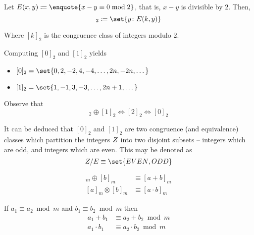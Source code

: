 \begin{remark}
    Let $E(x, y) \coloneqq \enquote{x - y \equiv 0 \bmod 2}$, that is, $x - y$ is divisible by $2$. Then,
    \begin{equation}
        [k]_2 \coloneqq \set{y \colon E(k, y)}
    \end{equation}
    
    Where $[k]_2$ is the congruence class of integers modulo $2$.
    
    Computing $[0]_2$ and $[1]_2$ yields
    \begin{itemize}
        \item $[0]_2 = \set{0, 2, -2, 4, -4, \dots, 2n, -2n, \dots}$
        \item $[1]_2 = \set{1, -1, 3, -3, \dots, 2n + 1, \dots}$
    \end{itemize}
    
    Observe that
    \begin{equation}
        [1]_2 \oplus [1]_2 \Leftrightarrow [2]_2 \Leftrightarrow [0]_2
    \end{equation}
    
    It can be deduced that $[0]_2$ and $[1]_2$ are two congruence (and equivalence) classes which partition the integers $\relax{Z}$ into two disjoint subsets -- integers which are odd, and integers which are even. This may be denoted as
    \begin{equation}
        \Int/E \equiv \set{\mathrm{EVEN}, \mathrm{ODD}}
    \end{equation}
\end{remark}

\begin{definition}
    \begin{align}
        [a]_m \oplus [b]_m &\equiv [a + b]_m \\
        [a]_m \otimes [b]_m &\equiv [a \cdot b]_m
    \end{align}
    
    If $a_1 \equiv a_2 \bmod m$ and $b_1 \equiv b_2 \bmod m$ then
    \begin{align}
        a_1 + b_1 &\equiv a_2 + b_2 \bmod m \\
        a_1 \cdot b_1 &\equiv a_2 \cdot b_2 \bmod m \\
    \end{align}
\end{definition}

